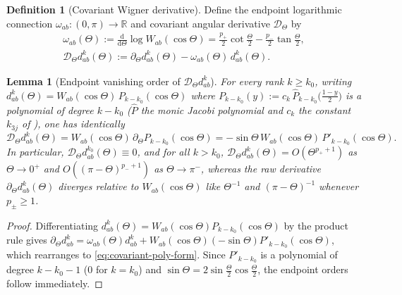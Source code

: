 \documentclass[11pt]{article}
\newtheorem{lemma}[theorem]{Lemma}
\theoremstyle{definition}
\newtheorem{definition}[theorem]{Definition}
\theoremstyle{remark}
\newcommand{\dd}{\mathrm{d}}
\newcommand{\cD}{\mathcal{D}}
\renewcommand{\_}{\oldunderscore\penalty0\hskip0pt\relax}
\begin{document}
\begin{definition}[Covariant Wigner derivative]
\label{def:covariant-derivative}
Define the endpoint logarithmic connection $\omega_{ab}:(0,\pi)\to\mathbb{R}$ and covariant angular derivative $\cD_\Theta$ by
\begin{equation}
  \begin{gathered}
  \omega_{ab}(\Theta) := \frac{\dd}{\dd\Theta}\log W_{ab}(\cos\Theta) = \frac{p_+}{2}\cot\frac{\Theta}{2} - \frac{p_-}{2}\tan\frac{\Theta}{2},\\
  \cD_\Theta d^k_{ab}(\Theta) := \partial_\Theta d^k_{ab}(\Theta) - \omega_{ab}(\Theta)\,d^k_{ab}(\Theta).
  \end{gathered}
  \label{eq:covariant-derivative}
\end{equation}
\end{definition}

\begin{lemma}[Endpoint vanishing order of $\cD_\Theta d^k_{ab}$]
\label{lem:covariant-regularity}
For every rank $k\ge k_0$, writing $d^k_{ab}(\Theta)=W_{ab}(\cos\Theta)\,P_{k-k_0}(\cos\Theta)$ where $P_{k-k_0}(y):=c_k\,\widehat P_{k-k_0}\bigl(\tfrac{1-y}{2}\bigr)$ is a polynomial of degree $k-k_0$ ($\widehat P$ the monic Jacobi polynomial and $c_k$ the constant $k_{3j}$ of
  \cite[Eq.~(68)]{LewisFixedRank}), one has identically
\begin{equation}
  \cD_\Theta d^k_{ab}(\Theta) = W_{ab}(\cos\Theta)\,\partial_\Theta P_{k-k_0}(\cos\Theta) = -\sin\Theta\,W_{ab}(\cos\Theta)\,P'_{k-k_0}(\cos\Theta).
  \label{eq:covariant-poly-form}
\end{equation}
In particular, $\cD_\Theta d^{k_0}_{ab}(\Theta)\equiv 0$, and for all $k>k_0$, $\cD_\Theta d^k_{ab}(\Theta)=O(\Theta^{p_++1})$ as
  $\Theta\to 0^+$ and $O((\pi-\Theta)^{p_-+1})$ as $\Theta\to\pi^-$, whereas the raw derivative $\partial_\Theta
  d^k_{ab}(\Theta)$ diverges relative to $W_{ab}(\cos\Theta)$ like $\Theta^{-1}$ and $(\pi-\Theta)^{-1}$ whenever $p_\pm\ge 1$.
\end{lemma}

\begin{proof}
Differentiating $d^k_{ab}(\Theta)=W_{ab}(\cos\Theta)P_{k-k_0}(\cos\Theta)$ by the product rule gives $\partial_\Theta
  d^k_{ab}=\omega_{ab}(\Theta)d^k_{ab}+W_{ab}(\cos\Theta)(-\sin\Theta)P'_{k-k_0}(\cos\Theta)$, which rearranges to
  \eqref{eq:covariant-poly-form}. Since $P'_{k-k_0}$ is a polynomial of degree $k-k_0-1$ ($0$ for $k=k_0$) and
  $\sin\Theta=2\sin\frac{\Theta}{2}\cos\frac{\Theta}{2}$, the endpoint orders follow immediately.
\end{proof}
\end{document}
